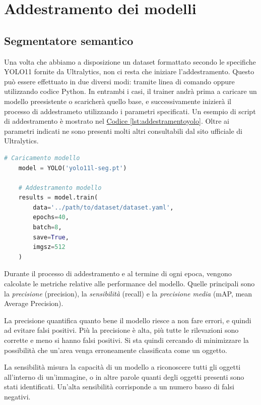 \documentclass[12pt]{report}
\begin{document}
\section{Addestramento dei modelli}
\label{sec:addestramento_dei modelli}

\subsection{Segmentatore semantico}
\label{sec:addestramento_segmentatore_semantico}

Una volta che abbiamo a disposizione un dataset formattato secondo le specifiche YOLO11 fornite da Ultralytics, non ci resta che iniziare l'addestramento. Questo può essere effettuato in due diversi modi: tramite linea di comando oppure utilizzando codice Python. In entrambi i casi, il trainer andrà prima a caricare un modello preesistente o scaricherà quello base, e successivamente inizierà il processo di addestrameto utilizzando i parametri specificati. Un esempio di script di addestramento è mostrato nel \hyperref[lst:addestramentoyolo]{Codice \ref{lst:addestramentoyolo}}. Oltre ai parametri indicati ne sono presenti molti altri consultabili dal sito ufficiale di Ultralytics.

\lstset{style=pythonstyle}
\begin{lstlisting}[language=Python, caption={Addestramento del modello YOLO11.}, label={lst:addestramentoyolo}, float]
	# Caricamento modello
	model = YOLO('yolo11l-seg.pt')
	
	# Addestramento modello
	results = model.train(
		data='../path/to/dataset/dataset.yaml',
		epochs=40,
		batch=8,
		save=True,
		imgsz=512
	)
\end{lstlisting}

Durante il processo di addestramento e al termine di ogni epoca, vengono calcolate le metriche relative alle performance del modello. Quelle principali sono la \textit{precisione} (precision), la \textit{sensibilità} (recall) e la \textit{precisione media} (mAP, mean Average Precision).

La precisione quantifica quanto bene il modello riesce a non fare errori, e quindi ad evitare falsi positivi. Più la precisione è alta, più tutte le rilevazioni sono corrette e meno si hanno falsi positivi. Si sta quindi cercando di minimizzare la possibilità che un'area venga erroneamente classificata come un oggetto.

La sensibilità misura la capacità di un modello a riconoscere tutti gli oggetti all'interno di un'immagine, o in altre parole quanti degli oggetti presenti sono stati identificati. Un'alta sensibilità corrisponde a un numero basso di falsi negativi.
\end{document}
